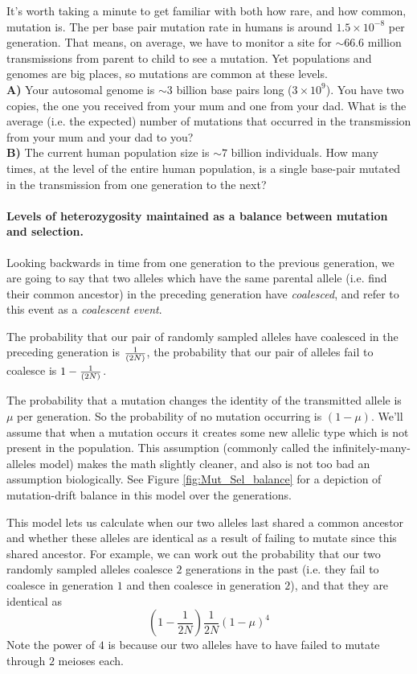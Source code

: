 \begin{question}
It's worth taking a minute to get familiar with both how rare, and how common, mutation is. The per base pair mutation rate in humans is around $1.5 \times 10^{-8}$ per generation. That means, on average, we have to monitor a site for $\sim 66.6$ million transmissions from parent to child to see a mutation. Yet populations and genomes are big places, so mutations are common at these levels. \\
{\bf A)} Your autosomal genome is $\sim 3$ billion base pairs long ($3 \times 10^9$). You have two copies, the one you received from your mum and one from your dad. What is the average (i.e. the expected) number of mutations that occurred in the transmission from your mum and your dad to you?\\
{\bf B)} The current human population size is $\sim 7$ billion individuals. How many times, at the level of the entire human population, is a single base-pair mutated in the transmission from one generation to the next? 
\end{question}
\paragraph{Levels of heterozygosity maintained as a balance between mutation and selection.}


Looking backwards in time from one generation to the previous generation, we are going to say that two alleles which have the same parental allele (i.e. find their common ancestor) in the preceding generation have \emph{coalesced}, and refer to this
event as a \emph{coalescent event}.

The probability that our pair of randomly sampled alleles have coalesced in the
preceding generation is $\nicefrac{1}{(2N)}$, the probability that our pair of
alleles fail to coalesce is $1-\nicefrac{1}{(2N)}$. 

The probability that a mutation changes the identity of the
transmitted allele is $\mu$ per generation. So the probability of no
mutation occurring is $(1-\mu)$. We'll assume that when a mutation
occurs it creates some new allelic type which is not present in the
population. This assumption (commonly called the infinitely-many-alleles model) makes the math slightly cleaner, and also
is not too bad an assumption biologically. See Figure
\ref{fig:Mut_Sel_balance} for a depiction of mutation-drift balance in
this model over the generations.

This model lets us calculate when our two alleles last shared a common
ancestor and whether these alleles are identical as a result of
failing to mutate since this shared ancestor.  For example, we can work out the probability that our
two randomly sampled alleles coalesce $2$ generations in the past
(i.e. they fail to coalesce in generation $1$ and then coalesce in
generation $2$), and
that they are identical as
\begin{equation}
\left(1- \frac{1}{2N} \right) \frac{1}{2N} (1-\mu)^4
\end{equation}
Note the power of $4$ is because our two alleles have to have failed
to mutate through $2$ meioses each. 

